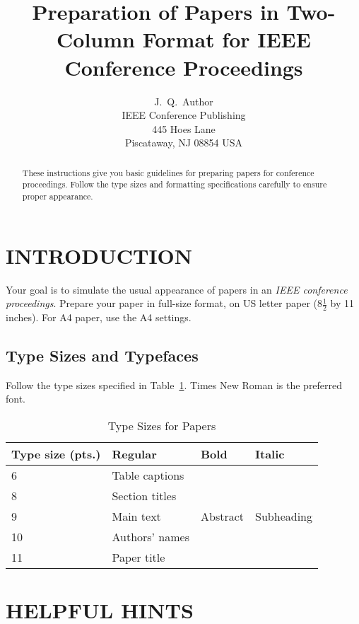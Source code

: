 \documentclass[conference]{IEEEtran}
\begin{document}
\title{Preparation of Papers in Two-Column Format for IEEE Conference Proceedings}

\author{J.~Q.~Author\\
IEEE Conference Publishing\\
445 Hoes Lane\\
Piscataway, NJ 08854 USA}

\maketitle

\begin{abstract}
These instructions give you basic guidelines for preparing papers for conference proceedings. Follow the type sizes and formatting specifications carefully to ensure proper appearance.
\end{abstract}

\section{INTRODUCTION}
Your goal is to simulate the usual appearance of papers in an \textit{IEEE conference proceedings}. Prepare your paper in full-size format, on US letter paper (8$\frac{1}{2}$ by 11 inches). For A4 paper, use the A4 settings.

\subsection{Type Sizes and Typefaces}
Follow the type sizes specified in Table~\ref{tab:type}. Times New Roman is the preferred font.

\begin{table}[ht]
\centering
\caption{Type Sizes for Papers}
\label{tab:type}
\begin{tabular}{|l|l|l|l|}
\hline
\textbf{Type size (pts.)} & \textbf{Regular} & \textbf{Bold} & \textbf{Italic} \\ \hline
6 & Table captions & & \\ \hline
8 & Section titles & & \\ \hline
9 & Main text & Abstract & Subheading \\ \hline
10 & Authors' names & & \\ \hline
11 & Paper title & & \\ \hline
\end{tabular}
\end{table}

\section{HELPFUL HINTS}
\end{document}
